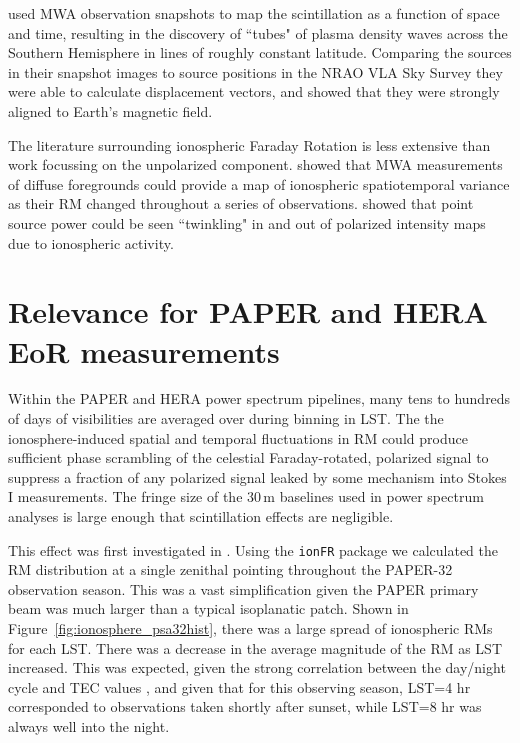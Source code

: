 \cite{Loi.15} used MWA observation snapshots to map the scintillation as a function of space and time, resulting in the discovery of ``tubes" of plasma density waves across the Southern Hemisphere in lines of roughly constant latitude. Comparing the sources in their snapshot images to source positions in the NRAO VLA Sky Survey \citep[NVSS][]{Condon.98} they were able to calculate displacement vectors, and showed that they were strongly aligned to Earth's magnetic field.

The literature surrounding ionospheric Faraday Rotation is less extensive than work focussing on the unpolarized component. \cite{Lenc.16} showed that MWA measurements of diffuse foregrounds could provide a map of ionospheric spatiotemporal variance as their RM changed throughout a series of observations. \cite{Lenc.17} showed that point source power could be seen ``twinkling" in and out of polarized intensity maps due to ionospheric activity.

\section{Relevance for PAPER and HERA EoR measurements}
\label{sec:widefieldRMionosphere}

Within the PAPER and HERA power spectrum pipelines, many tens to hundreds of days of visibilities are averaged over during binning in LST. The the ionosphere-induced spatial and temporal fluctuations in RM could produce sufficient phase scrambling of the celestial Faraday-rotated, polarized signal to suppress a fraction of any polarized signal leaked by some mechanism into Stokes I measurements. The fringe size of the 30\,m baselines used in power spectrum analyses is large enough that scintillation effects are negligible.

This effect was first investigated in \cite{Moore.17}. Using the {\tt ionFR} package \citep{Sotomayor-Beltran.13} we calculated the RM distribution at a single zenithal pointing throughout the PAPER-32 observation season. This was a vast simplification given the PAPER primary beam was much larger than a typical isoplanatic patch. Shown in Figure~\ref{fig:ionosphere_psa32hist}, there was a large spread of ionospheric RMs for each LST. There was a decrease in the average magnitude of the RM as LST increased. This was expected, given the strong correlation between the day/night cycle and TEC values \citep[e.g.][]{Tariku.15}, and given that for this observing season, LST=4 hr corresponded to observations taken shortly after sunset, while LST=8 hr was always well into the night.

